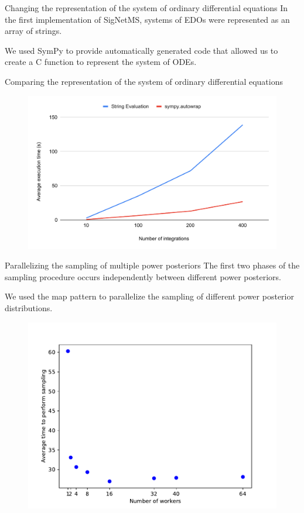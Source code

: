 \documentclass{beamer}
\begin{document}
\begin{frame}{Changing the representation of the system of ordinary
differential equations}
In the first implementation of SigNetMS, systems of EDOs were
represented as an array of strings. 

\pause
We used SymPy to provide automatically generated code that allowed us to
create a C function to represent the system of ODEs.
\end{frame}

\begin{frame}{Comparing the representation of the system of ordinary
differential equations}
\begin{figure}[t!]
\begin{center}
\includegraphics[width=.85\textwidth]{optimizations/system_representation.pdf}
\end{center}
\end{figure}

\end{frame}

\begin{frame}{Parallelizing the sampling of multiple power posteriors}
The first two phases of the sampling procedure occurs independently
between different power posteriors. \pause

We used the map pattern to parallelize the sampling of different power
posterior distributions. \pause

\begin{figure}[t!]
\begin{center}
\includegraphics[width=.65\textwidth]{optimizations/workers_experiment.pdf}
\end{center}
\end{figure}
\end{frame}
\end{document}

